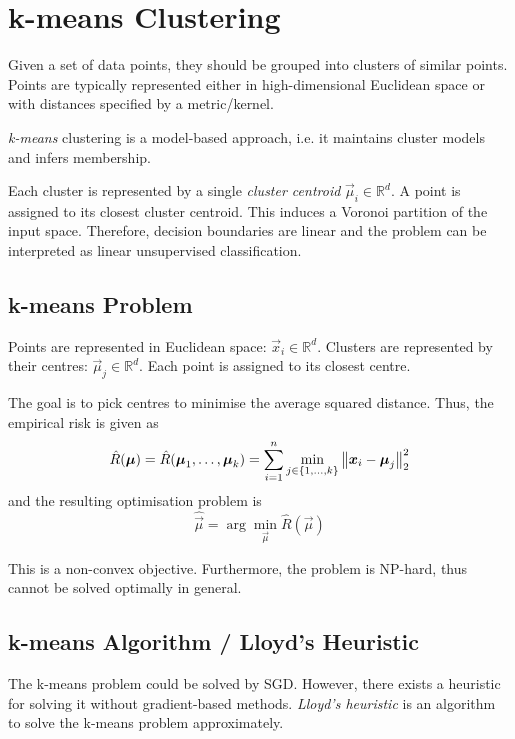 \section{k-means Clustering}
Given a set of data points,
they should be grouped into clusters of similar points.
Points are typically represented either in high-dimensional
Euclidean space or with distances specified by a metric/kernel.

\emph{k-means} clustering is a model-based approach,
i.e. it maintains cluster models and infers membership.

Each cluster is represented by a single
\emph{cluster centroid} $\vec{\mu}_i \in \mathbb{R}^d$.
A point is assigned to its closest cluster centroid.
This induces a Voronoi partition of the input space.
Therefore, decision boundaries are linear and the problem
can be interpreted as linear unsupervised classification.

\subsection{k-means Problem}
Points are represented in Euclidean space:
$\vec{x}_i \in \mathbb{R}^d$.
Clusters are represented by their centres:
$\vec{\mu}_j \in \mathbb{R}^d$.
Each point is assigned to its closest centre.

The goal is to pick centres to minimise the average squared
distance. Thus, the empirical risk is given as
\begin{equation*}
    \hat{R}(\boldsymbol{\mu}) =
    \hat{R}(\boldsymbol{\mu}_1, \dotsc, \boldsymbol{\mu}_k) =
    \sum_{i=1}^n{
        \min_{
            j \in \{1, \dotsc, k\}
        }{\left\lVert\boldsymbol{x}_i - \boldsymbol{\mu}_j\right\rVert_2^2}
    }
\end{equation*}
and the resulting optimisation problem is
\begin{equation*}
    \hat{\vec{\mu}} = \arg\min_{\vec{\mu}}{\hat{R}(\vec{\mu})}
\end{equation*}

This is a non-convex objective.
Furthermore, the problem is NP-hard,
thus cannot be solved optimally in general.


\subsection{k-means Algorithm / Lloyd's Heuristic}
The k-means problem could be solved by SGD.
However, there exists a heuristic for solving it
without gradient-based methods.
\emph{Lloyd's heuristic} is an algorithm to solve the
k-means problem approximately.

